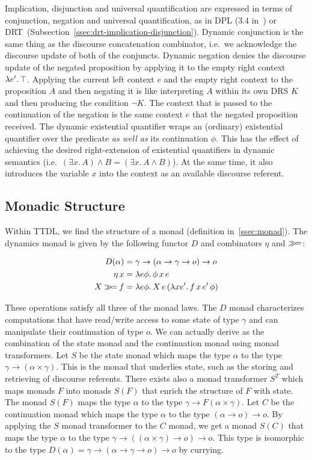 Implication, disjunction and universal quantification are expressed in
terms of conjunction, negation and universal quantification, as in DPL (3.4
in~\cite{groenendijk1991dynamic}) or
DRT~(Subsection~\ref{ssec:drt-implication-disjunction}). Dynamic
conjunction is the same thing as the discourse concatenation combinator,
i.e.\ we acknowledge the discourse update of both of the conjuncts. Dynamic
negation denies the discourse update of the negated proposition by applying
it to the empty right context $\lambda e'.\, \top$. Applying the current left
context $e$ and the empty right context to the proposition $A$ and then
negating it is like interpreting $A$ within its own DRS $K$ and then
producing the condition $\lnot K$. The context that is passed to the
continuation of the negation is the same context $e$ that the negated
proposition received. The dynamic existential quantifier wraps an
(ordinary) existential quantifier over the predicate \emph{as well as} its
continuation $\phi$. This has the effect of achieving the desired
right-extension of existential quantifiers in dynamic semantics (i.e.\
$(\exists x.\, A) \land B = (\exists x.\, A \land B)$). At the same time,
it also introduces the variable $x$ into the context as an available
discourse referent.


\subsection{Monadic Structure}
\label{ssec:ttdl-monadic-structure}

Within TTDL, we find the structure of a monad (definition
in~\ref{ssec:monad}). The dynamics monad is given by the following functor
$D$ and combinators $\eta$ and $\mathbin{\gg\!=}$:

\begin{align*}
  D(\alpha) &= \gamma \to (\alpha \to \gamma \to o) \to o \\
  \eta\,x &= \lambda e \phi.\, \phi\,x\,e \\
  X \mathbin{\gg\!=} f &= \lambda e \phi.\, X\,e\,(\lambda x e'.\, f\,x\,e'\,\phi)
\end{align*}

These operations satisfy all three of the monad laws. The $D$ monad
characterizes computations that have read/write access to some state of
type $\gamma$ and can manipulate their continuation of type $o$. We can
actually derive as the combination of the state monad and the continuation
monad using monad transformers. Let $S$ be the state monad which maps the
type $\alpha$ to the type $\gamma \to (\alpha \times \gamma)$. This is the
monad that underlies state, such as the storing and retrieving of discourse
referents. There exists also a monad transformer $S^T$ which maps monads
$F$ into monads $S(F)$ that enrich the structure of $F$ with state. The
monad $S(F)$ maps the type $\alpha$ to the type
$\gamma \to F(\alpha \times \gamma)$. Let $C$ be the continuation monad
which maps the type $\alpha$ to the type $(\alpha \to o) \to o$. By
applying the $S$ monad transformer to the $C$ monad, we get a monad $S(C)$
that maps the type $\alpha$ to the type
$\gamma \to ((\alpha \times \gamma) \to o) \to o$. This type is isomorphic
to the type $D(\alpha) = \gamma \to (\alpha \to \gamma \to o) \to o$ by
currying.

